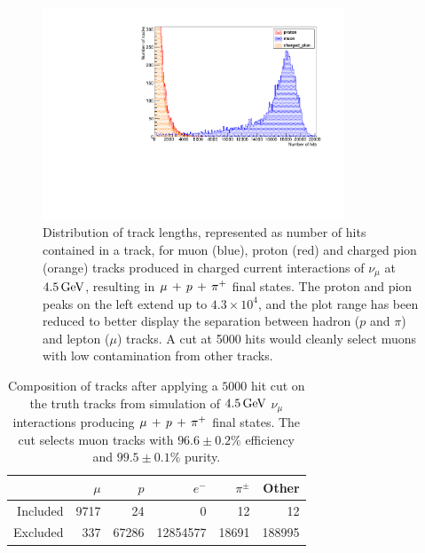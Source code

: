 \begin{figure}
\centering
\includegraphics[angle=-90,width=0.8\textwidth]{chapters/particleid_images/tracks-ccpi-4500MeV}
\caption[Track length distribution for $\mu$, $p$ and $\pi^+$ from $4.5\GeV$ neutrinos (\acs{CCPi})]{\label{fig:ccpi-track-lengths-4500MeV}Distribution of track lengths, represented as number of hits contained in a track, for muon (blue), proton (red) and charged pion (orange) tracks produced in charged current interactions of $\nu_\mu$ at $4.5\GeV$, resulting in $\mu\,+\,p\,+\,\pi^{+}$ final states. The proton and pion peaks on the left extend up to $4.3\times10^4$, and the plot range has been reduced to better display the separation between hadron ($p$ and $\pi$) and lepton ($\mu$) tracks. A cut at 5000 hits would cleanly select muons with low contamination from other tracks.}
\end{figure}

\begin{table}
\centering
\begin{tabular}{*{6}{r}}
 & $\mu$ & $p$ & $e^-$ & $\pi^\pm$ & Other \\
\hline
\hline
Included & 9717 & 24 & 0 & 12 & 12 \\
Excluded & 337 & 67286 & 12854577 & 18691 & 188995 \\
\hline
\end{tabular}
\caption[Composition of tracks after $5000$ hit cut on $4.5\GeV$ \acs{CCPi} events]{\label{table:cut-results-ccpi-4.5}Composition of tracks after applying a $5000$ hit cut on the truth tracks from simulation of $4.5\GeV$ $\nu_\mu$ interactions producing $\mu\,+\,p\,+\,\pi^{+}$ final states. The cut selects muon tracks with $96.6\pm0.2\%$ efficiency and $99.5\pm0.1\%$ purity.}
\end{table}

\clearpage

